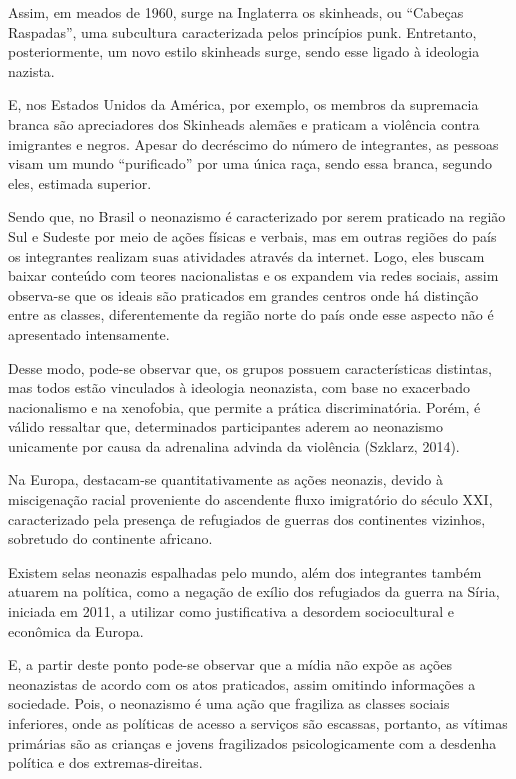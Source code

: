 \documentclass[article,12pt,onesidea,4paper,english,brazil]{abntex2}
\begin{document}
	Assim, em meados de 1960, surge na Inglaterra os skinheads, ou “Cabeças Raspadas”, uma subcultura caracterizada pelos princípios punk. Entretanto, posteriormente, um novo estilo skinheads surge, sendo esse ligado à ideologia nazista.
	
	E, nos Estados Unidos da América, por exemplo, os membros da supremacia branca são apreciadores dos Skinheads alemães e praticam a violência contra imigrantes e negros. Apesar do decréscimo do número de integrantes, as pessoas visam um mundo “purificado” por uma única raça, sendo essa branca, segundo eles, estimada superior.
	
	Sendo que, no Brasil o neonazismo é caracterizado por serem praticado na região Sul e Sudeste por meio de ações físicas e verbais, mas em outras regiões do país os integrantes realizam suas atividades através da internet. Logo, eles buscam baixar conteúdo com teores nacionalistas e os expandem via redes sociais, assim observa-se que os ideais são praticados em grandes centros onde há distinção entre as classes, diferentemente da região norte do país onde esse aspecto não é apresentado intensamente.
	
	Desse modo, pode-se observar que, os grupos possuem características distintas, mas todos estão vinculados à ideologia neonazista, com base no exacerbado nacionalismo e na xenofobia, que permite a prática discriminatória. Porém, é válido ressaltar que, determinados participantes aderem ao neonazismo unicamente por causa da adrenalina advinda da violência (Szklarz, 2014).
	
	Na Europa, destacam-se quantitativamente as ações neonazis, devido à miscigenação racial proveniente do ascendente fluxo imigratório do século XXI, caracterizado pela presença de refugiados de guerras dos continentes vizinhos, sobretudo do continente africano.
	
	Existem selas neonazis espalhadas pelo mundo, além dos integrantes também atuarem na política, como a negação de exílio dos refugiados da guerra na Síria, iniciada em 2011, a utilizar como justificativa a desordem sociocultural e econômica da Europa.
	
	E, a partir deste ponto pode-se observar que a mídia não expõe as ações neonazistas de acordo com os atos praticados, assim omitindo informações a sociedade. Pois, o neonazismo é uma ação que fragiliza as classes sociais inferiores, onde as políticas de acesso a serviços são escassas, portanto, as vítimas primárias são as crianças e jovens fragilizados psicologicamente com a desdenha política e dos extremas-direitas.
	
\end{document}
